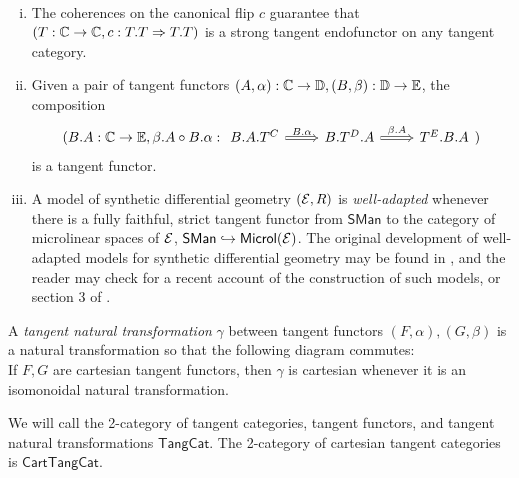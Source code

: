 \begin{example}\label{ex:composition-of-tangent-functors}
    ~\begin{enumerate}[(i)]
        \item The coherences on the canonical flip $c$ guarantee that $(T:\mathbb{C} \to \mathbb{C},c:T.T \Rightarrow T.T)$ is a strong tangent endofunctor on any tangent category. 
        \item Given a pair of tangent functors $(A,\alpha):\mathbb{C} \to \mathbb{D}, (B, \beta): \mathbb{D} \to \mathbb{E}$, the composition 
        \[
            (B.A:\C \to \mathbb{E}, \beta.A \o B.\alpha: %
            \begin{tikzcd}
                {B.A.T^C} & {B.T^D.A} & {T^E.B.A}
                \arrow["{B.\alpha}", Rightarrow, from=1-1, to=1-2]
                \arrow["{\beta.A}", Rightarrow, from=1-2, to=1-3]
            \end{tikzcd})
        \]
        is a tangent functor.
        \item A model of synthetic differential geometry $(\mathcal{E},R)$ is \emph{well-adapted} whenever there is a fully faithful, strict tangent functor from $\mathsf{SMan}$ to the category of microlinear spaces of $\mathcal{E}$,  $\mathsf{SMan} \hookrightarrow \mathsf{Microl}(\mathcal{E})$. The original development of well-adapted models for synthetic differential geometry may be found in \cite{Dubuc1981}, and the reader may check \cite{Bunge2018} for a recent account of the construction of such models, or section 3 of \cite{Kock2006}.
    \end{enumerate}
\end{example}


\begin{definition}\label{def:tang-nat}
    A \emph{tangent natural transformation} $\gamma$ between tangent functors $(F,\alpha), (G,\beta)$ is a natural transformation so that the following diagram commutes:
    \[
        
    \] 
    If $F, G$ are cartesian tangent functors, then $\gamma$ is cartesian whenever it is an isomonoidal natural transformation.
\end{definition}
\begin{definition}\label{def:tang-2cat}
    We will call the 2-category of tangent categories, tangent functors, and tangent natural transformations $\mathsf{TangCat}$. The 2-category of cartesian tangent categories is $\mathsf{CartTangCat}$.
\end{definition}


